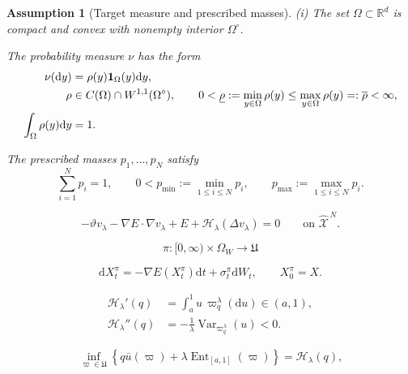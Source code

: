 \documentclass[10pt,a4paper]{amsart}
\newtheorem{assumption}{Assumption}
\newcommand{\Ent}{\operatorname{Ent}}
\def\R{\mathbb{R}}
\def\Xc{{\mathcal X}}
\newcommand{\dd}{\mathrm{d}}
\def\hX{\widehat{\Xc}^{\,N}}
\def\id{\mathbf{1}}
\newcommand{\pmax}{p_{\max}}
\newcommand{\pmin}{p_{\min}}
\begin{document}
\begin{assumption}[Target measure and prescribed masses]\label{ass:geometry}
{\rm (i)} The set $\Omega\subset\R^d$ is compact and convex with nonempty interior $\Omega^\circ$.

\medskip

 The probability measure $\nu$ has the form
\begin{align}
 \nu(\dd y)&=\rho(y)\id_{\Omega}(y)\dd y,
 \label{eq:density-assumption-main}\\
 \rho&\in C(\Omega)\cap W^{1,1}(\Omega^\circ),
 \qquad
 0<\underline\rho:=\min_{y\in\Omega}\rho(y)
 \le \max_{y\in\Omega}\rho(y)=:\overline\rho<\infty,
 \notag\\
 \int_\Omega\rho(y)\dd y&=1.
 \notag
\end{align}

 The prescribed masses $p_1,\ldots,p_N$ satisfy
\begin{equation}\label{eq:weights-main}
 \sum_{i=1}^Np_i=1,
 \qquad
 0<\pmin:=\min_{1\le i\le N}p_i,
 \qquad
 \pmax:=\max_{1\le i\le N}p_i.
\end{equation}
\end{assumption}

\begin{equation}\label{eq:exploratory-HJB-main-results}
 -\vartheta v_\lambda
 -\nabla E\cdot\nabla v_\lambda
 +E
 +\mathscr H_\lambda(\Delta v_\lambda)
 =0
 \qquad\text{on }\hX.
\end{equation}

\begin{equation}\label{eq:admissible-control-class}
 \pi:[0,\infty)\times\Omega_W\longrightarrow\mathfrak U
\end{equation}

\begin{equation}\label{eq:controlled-SDE}
 \dd X_t^\pi=-\nabla E(X_t^\pi)\dd t+\sigma_t^\pi\dd W_t,
 \qquad X_0^\pi=X.
\end{equation}

\begin{align}
 \mathscr H_\lambda'(q)
 &=\int_a^1u\,\varpi_q^\lambda(\dd u)\in(a,1),
 \label{eq:H-prime}\\
 \mathscr H_\lambda''(q)
 &=-\frac1\lambda\operatorname{Var}_{\varpi_q^\lambda}(u)<0.
 \label{eq:H-second}
\end{align}

\begin{equation}\label{eq:gibbs-variational}
 \inf_{\varpi\in\mathfrak U}
 \left\{q\bar u(\varpi)+\lambda\Ent_{[a,1]}(\varpi)\right\}
 =\mathscr H_\lambda(q),
\end{equation}
\end{document}
